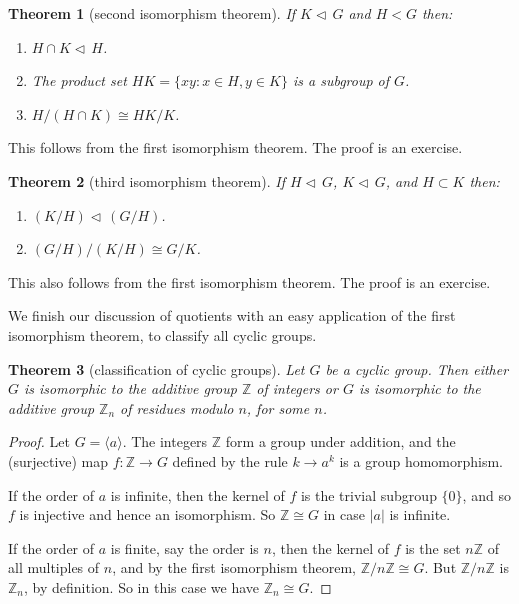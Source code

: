 \documentclass[11pt]{article}
\newtheorem{thm}{Theorem}[section]
\theoremstyle{definition}
\newcommand{\Z}{\mathbb{Z}} %
\newcommand{\gen}[1]{\langle #1 \rangle}
\newcommand{\normal}{\triangleleft\,}%
\begin{document}
\begin{thm}[second isomorphism theorem]\label{thm:iso2}
%
  If $K \normal G$ and $H < G$ then:
\begin{enumerate}
  \item $H \cap K \normal H$.
  \item The product set $HK = \{xy \colon x \in H, y \in K\}$ is a
    subgroup of $G$.
  \item $H/(H \cap K) \cong HK/K$.
\end{enumerate}
\end{thm}

This follows from the first isomorphism theorem. The proof is an
exercise.

\begin{thm}[third isomorphism theorem]\label{thm:iso3}%
%
If $H \normal G$, $K \normal G$, and $H \subset K$ then:
\begin{enumerate}
  \item  $(K/H) \normal (G/H)$.
  \item $(G/H)/(K/H) \cong G/K$.
\end{enumerate}
\end{thm}

This also follows from the first isomorphism theorem. The proof is an
exercise.


We finish our discussion of quotients with an easy application of the
first isomorphism theorem, to classify all cyclic groups.

\begin{thm}[classification of cyclic groups]
Let $G$ be a cyclic group. Then either $G$ is isomorphic to the
additive group $\Z$ of integers or $G$ is isomorphic to the additive
group $\Z_n$ of residues modulo $n$, for some $n$.
\end{thm}

\begin{proof}
Let $G = \gen{a}$.  The integers $\Z$ form a group under addition, and
the (surjective) map $f:\Z \to G$ defined by the rule $k \to a^k$ is a
group homomorphism. 

If the order of $a$ is infinite, then the kernel of $f$ is the trivial
subgroup $\{0\}$, and so $f$ is injective and hence an isomorphism. So
$\Z \cong G$ in case $|a|$ is infinite.

If the order of $a$ is finite, say the order is $n$, then the kernel
of $f$ is the set $n\Z$ of all multiples of $n$, and by the first
isomorphism theorem, $\Z/n\Z \cong G$. But $\Z/n\Z$ is $\Z_n$, by
definition. So in this case we have $\Z_n \cong G$. 
\end{proof}
\end{document}
